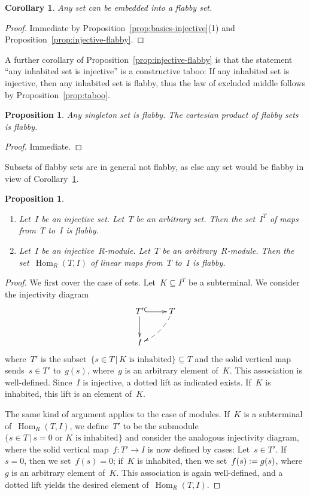 \documentclass[oneside]{amsart}
\theoremstyle{definition}
\theoremstyle{plain}
\newtheorem{prop}[defn]{Proposition}
\newtheorem{cor}[defn]{Corollary}
\theoremstyle{remark}
\newcommand{\defeq}{\vcentcolon=}
\DeclareMathOperator{\Hom}{Hom}
\renewcommand{\_}{\mathpunct{.}\,}
\begin{document}
\begin{cor}\label{cor:enough-flabby-sets}
Any set can be embedded into a flabby set.\end{cor}

\begin{proof}Immediate by Proposition~\ref{prop:basics-injective}(1) and
Proposition~\ref{prop:injective-flabby}.\end{proof}

A further corollary of Proposition~\ref{prop:injective-flabby} is that the
statement ``any inhabited set is injective'' is a constructive taboo: If any
inhabited set is injective, then any inhabited set is flabby, thus the law of
excluded middle follows by Proposition~\ref{prop:taboo}.

\begin{prop}Any singleton set is flabby. The cartesian product of flabby sets
is flabby.\end{prop}

\begin{proof}Immediate.\end{proof}

Subsets of flabby sets are in general not flabby, as else any set would be
flabby in view of Corollary~\ref{cor:enough-flabby-sets}.

\begin{prop}\label{prop:hom-flabby}
\begin{enumerate}
\item Let~$I$ be an injective set. Let~$T$ be an arbitrary set. Then the
set~$I^T$ of maps from~$T$ to~$I$ is flabby.
\item Let~$I$ be an injective~$R$-module. Let~$T$ be an arbitrary~$R$-module. Then the
set~$\Hom_R(T,I)$ of linear maps from~$T$ to~$I$ is flabby.
\end{enumerate}\end{prop}

\begin{proof}We first cover the case of sets. Let~$K \subseteq I^T$ be a
subterminal. We consider the injectivity diagram
\[ \xymatrix{
  T' \ar@{^{(}->}[r]\ar[d] & T \ar@{-->}@/^/[ld] \\
  I
} \]
where~$T'$ is the subset~$\{ s \in T \,|\, \text{$K$ is inhabited} \} \subseteq T$ and the
solid vertical map sends~$s \in T'$ to~$g(s)$, where~$g$ is an arbitrary element
of~$K$. This association is well-defined. Since~$I$ is injective, a dotted lift
as indicated exists. If~$K$ is inhabited, this lift is an element of~$K$.

The same kind of argument applies to the case of modules. If~$K$ is a
subterminal of~$\Hom_R(T,I)$, we define~$T'$ to be the submodule
$\{ s \in T \,|\, \text{$s = 0$ or $K$ is inhabited} \}$ and consider the
analogous injectivity diagram, where the solid vertical map~$f : T' \to I$ is now
defined by cases: Let~$s \in T'$. If~$s = 0$, then we set~$f(s) = 0$; if~$K$ is
inhabited, then we set~$f(s) \defeq g(s)$, where~$g$ is an arbitrary element
of~$K$. This association is again well-defined, and a dotted lift yields the
desired element of~$\Hom_R(T,I)$.
\end{proof}
\end{document}

